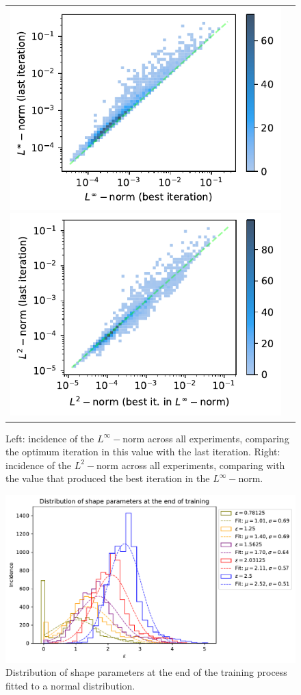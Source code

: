 \documentclass[12pt]{report} %
\begin{document}
\begin{figure}[h]
  \hspace*{-2cm}
  \begin{tabular}{cc}
    \includegraphics[width=.6\textwidth]{imagenes/experiments/1d/statistical_1d_full_scheduler_interpolation/incidence_of_linf.pdf}
  \includegraphics[width=.6\textwidth]{imagenes/experiments/1d/statistical_1d_full_scheduler_interpolation/incidence_of_l2.pdf}
  \end{tabular}
  \caption{Left: incidence of the $L^\infty-$norm across all experiments, comparing the optimum iteration in this value with the last iteration. Right: incidence of the $L^2-$norm across all experiments, comparing with the value that produced the best iteration in the $L^\infty-$norm.}
  \label{fig:u2-results-incidence-l-norms}
\end{figure}

\begin{figure}[h]
  \includegraphics[width=\textwidth]{imagenes/experiments/1d/statistical_1d_full_scheduler_interpolation/distribution_of_shape_parameters_at_end_of_training.pdf}
  \caption{Distribution of shape parameters at the end of the training process fitted to a normal distribution.}
  \label{fig:u2-results-shape-parameters}
\end{figure}
\end{document}

